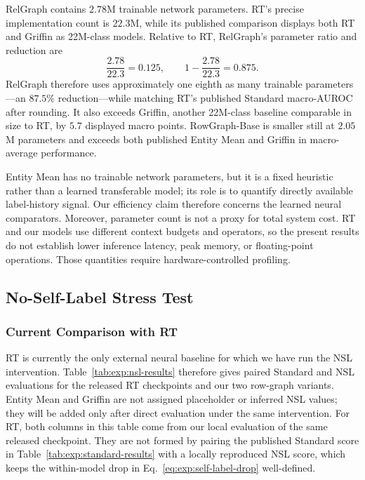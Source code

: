 RelGraph contains \(2.78\)M trainable network parameters. RT's precise
implementation count is \(22.3\)M, while its published comparison displays
both RT and Griffin as 22M-class models. Relative to RT, RelGraph's parameter
ratio and reduction are
\begin{equation}
  \frac{2.78}{22.3}=0.125,
  \qquad
  1-\frac{2.78}{22.3}=0.875.
\label{eq:exp:parameter-ratio}
\end{equation}
RelGraph therefore uses approximately one eighth as many trainable
parameters---an \(87.5\%\) reduction---while matching RT's published
Standard macro-AUROC after rounding. It also exceeds Griffin, another
22M-class baseline comparable in size to RT, by \(5.7\) displayed macro
points. RowGraph-Base is smaller still at \(2.05\)M parameters and exceeds
both published Entity Mean and Griffin in macro-average performance.

Entity Mean has no trainable network parameters, but it is a fixed heuristic
rather than a learned transferable model; its role is to quantify directly
available label-history signal. Our efficiency claim therefore concerns the
learned neural comparators. Moreover, parameter count is not a proxy for
total system cost. RT and our models use different context budgets and
operators, so the present results do not establish lower inference latency,
peak memory, or floating-point operations. Those quantities require
hardware-controlled profiling.

\subsection{No-Self-Label Stress Test}
\label{sec:exp:nsl-results}

\subsubsection{Current Comparison with RT}
\label{sec:exp:nsl-aggregate}

RT is currently the only external neural baseline for which we have run the
NSL intervention. Table~\ref{tab:exp:nsl-results} therefore gives paired
Standard and NSL evaluations for the released RT checkpoints and our two
row-graph variants. Entity Mean and Griffin are not assigned placeholder or
inferred NSL values; they will be added only after direct evaluation under
the same intervention. For RT, both columns in this table come from our
local evaluation of the same released checkpoint. They are not formed by
pairing the published Standard score in
Table~\ref{tab:exp:standard-results} with a locally reproduced NSL score,
which keeps the within-model drop in Eq.~\eqref{eq:exp:self-label-drop}
well-defined.

